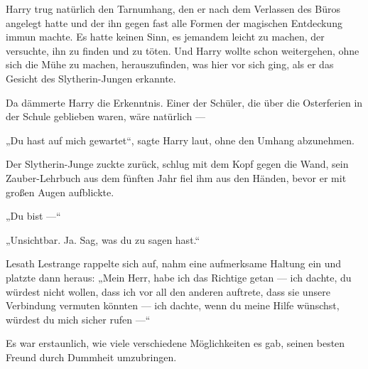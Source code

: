 Harry trug natürlich den Tarnumhang, den er nach dem Verlassen des Büros angelegt hatte und der ihn gegen fast alle Formen der magischen Entdeckung immun machte. Es hatte keinen Sinn, es jemandem leicht zu machen, der versuchte, ihn zu finden und zu töten. Und Harry wollte schon weitergehen, ohne sich die Mühe zu machen, herauszufinden, was hier vor sich ging, als er das Gesicht des Slytherin-Jungen erkannte.

Da dämmerte Harry die Erkenntnis. Einer der Schüler, die über die Osterferien in der Schule geblieben waren, wäre natürlich —

„Du hast auf mich gewartet“, sagte Harry laut, ohne den Umhang abzunehmen.

Der Slytherin-Junge zuckte zurück, schlug mit dem Kopf gegen die Wand, sein Zauber-Lehrbuch aus dem fünften Jahr fiel ihm aus den Händen, bevor er mit großen Augen aufblickte.

„Du bist —“

„Unsichtbar. Ja. Sag, was du zu sagen hast.“

Lesath Lestrange rappelte sich auf, nahm eine aufmerksame Haltung ein und platzte dann heraus:
„Mein Herr, habe ich das Richtige getan — ich dachte, du würdest nicht wollen, dass ich vor all den anderen auftrete, dass sie unsere Verbindung vermuten könnten — ich dachte, wenn du meine Hilfe wünschst, würdest du mich sicher rufen —“

Es war erstaunlich, wie viele verschiedene Möglichkeiten es gab, seinen besten Freund durch Dummheit umzubringen.


